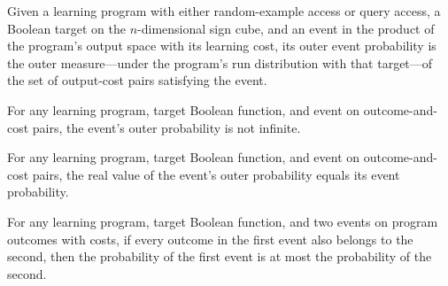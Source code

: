 \begin{definition}
\label{FABL.LearningProgram.outerEventProbability}
\leanok
{}
Given a learning program with either random-example access or query access, a Boolean
target on the $n$-dimensional sign cube, and an event in the product of the program’s
output space with its learning cost, its outer event probability is the outer
measure—under the program’s run distribution with that target—of the set of output-cost
pairs satisfying the event.
\end{definition}

\begin{theorem}
\label{FABL.LearningProgram.outerEventProbability_ne_top}
\leanok
{}
For any learning program, target Boolean function, and event on outcome-and-cost pairs,
the event's outer probability is not infinite.
\end{theorem}

\begin{theorem}
\label{FABL.LearningProgram.outerEventProbability_toReal}
\leanok
{}
For any learning program, target Boolean function, and event on outcome-and-cost pairs,
the real value of the event's outer probability equals its event probability.
\end{theorem}

\begin{theorem}
\label{FABL.LearningProgram.eventProbability_mono}
\leanok
{}
For any learning program, target Boolean function, and two events on program outcomes
with costs, if every outcome in the first event also belongs to the second, then the
probability of the first event is at most the probability of the second.
\end{theorem}

